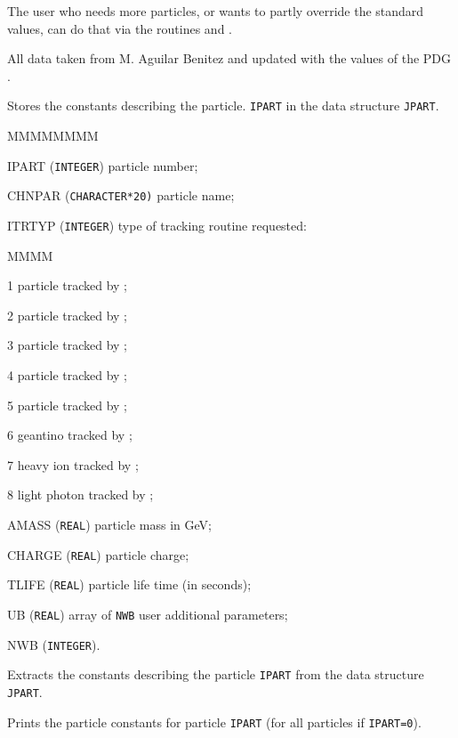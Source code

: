 The user who needs 
more particles, or wants to partly override the standard values,
can do that via the routines  and .
 
All data taken from M. Aguilar Benitez \cite{bib-AGUI} and updated with
the values of the PDG \cite{bib-PDGD}.
 
 
Stores the constants describing the particle.
{\tt IPART} in the data structure {\tt JPART}.
\begin{DLtt}{MMMMMMMM}
\item[IPART]   ({\tt INTEGER}) particle number;
\item[CHNPAR]  ({\tt CHARACTER*20)} particle name;
\item[ITRTYP]  ({\tt INTEGER}) type of tracking routine requested:
\begin{DLtt}{MMMM}
\item[1] particle tracked by ;
\item[2] particle tracked by ;
\item[3] particle tracked by ;
\item[4] particle tracked by ;
\item[5] particle tracked by ;
\item[6] geantino tracked by ;
\item[7] heavy ion tracked by ;
\item[8] light photon tracked by ;
\end{DLtt}
\item [AMASS]  ({\tt REAL}) particle mass in GeV;
\item[CHARGE]  ({\tt REAL}) particle charge;
\item[TLIFE]   ({\tt REAL}) particle life time (in seconds);
\item[UB]      ({\tt REAL}) array of {\tt NWB} user additional parameters;
\item[NWB]     ({\tt INTEGER}).
\end{DLtt}
 
 
Extracts the constants describing the
particle {\tt IPART} from the data structure {\tt JPART}.
 
 
Prints the particle constants
for  particle {\tt IPART} (for all particles if {\tt IPART=0}).
